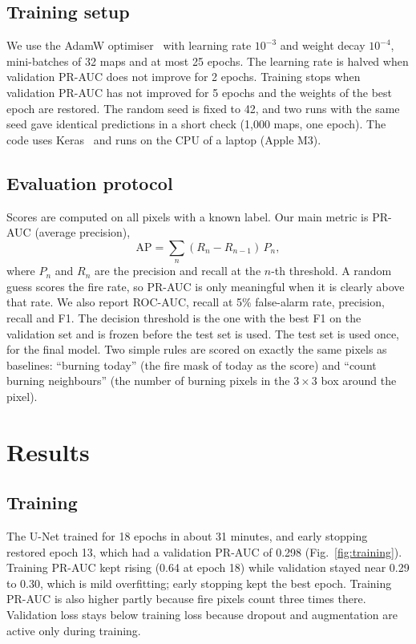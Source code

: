 \documentclass[10pt,letterpaper,twocolumn]{article}
\begin{document}
\subsection{Training setup}
We use the AdamW optimiser~\cite{loshchilov2019} with learning rate $10^{-3}$ and
weight decay $10^{-4}$, mini-batches of 32 maps and at most 25 epochs. The
learning rate is halved when validation PR-AUC does not improve for 2 epochs.
Training stops when validation PR-AUC has not improved for 5 epochs and the
weights of the best epoch are restored. The random seed is fixed to 42, and two
runs with the same seed gave identical predictions in a short check (1,000 maps,
one epoch). The code uses Keras~\cite{chollet2015} and runs on the CPU of a
laptop (Apple M3).

\subsection{Evaluation protocol}
Scores are computed on all pixels with a known label. Our main metric is PR-AUC
(average precision),
\begin{equation}
  \mathrm{AP} = \sum_n (R_n - R_{n-1})\,P_n,
\end{equation}
where $P_n$ and $R_n$ are the precision and recall at the $n$-th threshold. A
random guess scores the fire rate, so PR-AUC is only meaningful when it is
clearly above that rate. We also report ROC-AUC, recall at 5\% false-alarm rate,
precision, recall and F1. The decision threshold is the one with the best F1 on
the validation set and is frozen before the test set is used. The test set is
used once, for the final model. Two simple rules are scored on exactly the same
pixels as baselines: ``burning today'' (the fire mask of today as the score) and
``count burning neighbours'' (the number of burning pixels in the $3\times3$ box
around the pixel).

\section{Results}
\subsection{Training}
The U-Net trained for 18 epochs in about 31 minutes, and early stopping restored
epoch 13, which had a validation PR-AUC of 0.298 (Fig.~\ref{fig:training}).
Training PR-AUC kept rising (0.64 at epoch 18) while validation stayed near 0.29
to 0.30, which is mild overfitting; early stopping kept the best epoch. Training
PR-AUC is also higher partly because fire pixels count three times there.
Validation loss stays below training loss because dropout and augmentation are
active only during training.
\end{document}
